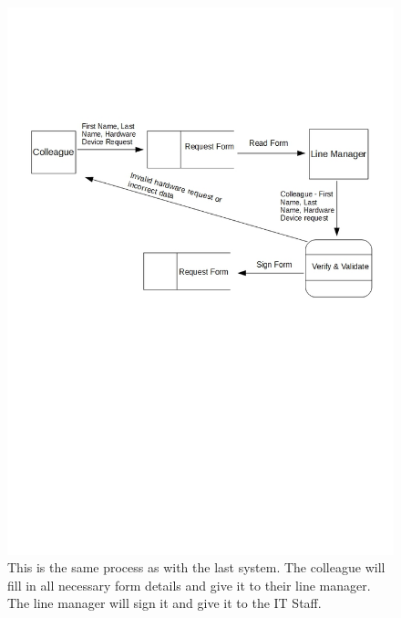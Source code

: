 \begin{figure}[H]
\includegraphics[width=\textwidth]{CurrentDFD.jpg}
\caption{This is the same process as with the last system. The colleague will fill in all necessary form details and give it to their line manager. The line manager will sign it and give it to the IT Staff.} \label{Page1Interview}
\end{figure}

